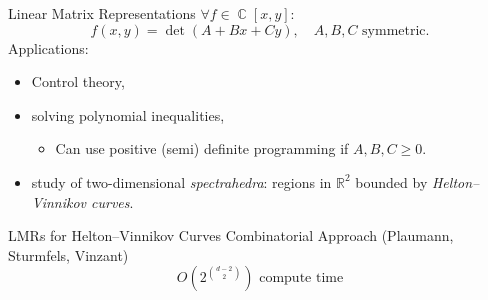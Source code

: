 \documentclass{beamer}
\DeclareMathOperator{\CC}{\mathbb{C}}
\newcommand{\thetachar}[2] {\theta {\scriptsize \begin{bmatrix}#1\\#2\end{bmatrix}}}
\begin{document}
\begin{frame}{Linear Matrix Representations}{}
  $\forall f \in \CC[x,y]$:
  \[
      f(x,y) = \det(A + Bx + Cy), \quad A,B,C \text{ symmetric}.
  \]
  Applications:
  \begin{itemize}
    \item Control theory,
    \item solving polynomial inequalities,
      \begin{itemize}
        \item Can use positive (semi) definite programming if $A,B,C
          \geq 0$.
      \end{itemize}
    \item study of two-dimensional {\it spectrahedra}: regions in
      $\mathbb{R}^2$ bounded by {\it Helton--Vinnikov curves}.
  \end{itemize}
\end{frame}



\begin{frame}{LMRs for Helton--Vinnikov Curves}{}
  Combinatorial Approach (Plaumann, Sturmfels, Vinzant)
  \[
      O \left( 2^{d-2 \choose 2} \right)
      \text{ compute time}
  \]

\end{frame}


\end{document}
